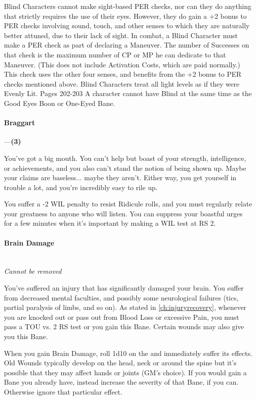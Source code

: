 \documentclass[oneside,11pt,english]{book}
\begin{document}
Blind Characters cannot make sight-based PER checks, nor can they do anything that strictly requires the 
use of their eyes. However, they do gain a +2 bonus to PER checks involving sound, touch, and other 
senses to which they are naturally better attuned, due to their lack of sight. In combat, a Blind Character 
must make a PER check as part of declaring a Maneuver. The number of Successes on that check is the 
maximum number of CP or MP he can dedicate to that Maneuver. (This does not include Activation 
Costs, which are paid normally.) 
This check uses the other four senses, and benefits from the +2 bonus to PER checks mentioned above. 
Blind Characters treat all light levels as if they were Evenly Lit. Pages 202-203 
A character cannot have Blind at the same time as the Good Eyes Boon or One-Eyed Bane. 
\paragraph{\label{bane:Braggart}Braggart}---\quad\textbf{(3)}\par
You've got a big mouth. You can't help but boast of your strength, intelligence, or achievements, and you 
also can't stand the notion of being shown up. Maybe your claims are baseless... maybe they aren't. Either 
way, you get yourself in trouble a lot, and you're incredibly easy to rile up. 


You suffer a -2 WIL penalty to resist Ridicule rolls, and you must regularly relate your greatness to 
anyone who will listen. You can suppress your boastful urges for a few minutes when it's important by 
making a WIL test at RS 2. 

 

\paragraph{\label{bane:Brain Damage}Brain Damage}\quad\\
\textit{Cannot be removed}\par
You've suffered an injury that has significantly damaged your brain. You suffer from decreased mental 
faculties, and possibly some neurological failures (tics, partial paralysis of limbs, and so on). As stated in \autoref{ch:injuryrecovery}, whenever you are knocked out or pass out from Blood Loss or excessive Pain, you must pass a TOU vs. 2 RS test or you gain this Bane. Certain wounds may also give you this Bane. 


When you gain Brain Damage, roll 1d10 on the  and immediately suffer its effects.\\
Old Wounds typically develop on the head, neck or around the spine but it’s possible that they may affect hands or joints (GM’s choice). If you would gain a Bane you already have, instead increase the severity of that Bane, if you can. Otherwise ignore that particular effect.
\end{document}
